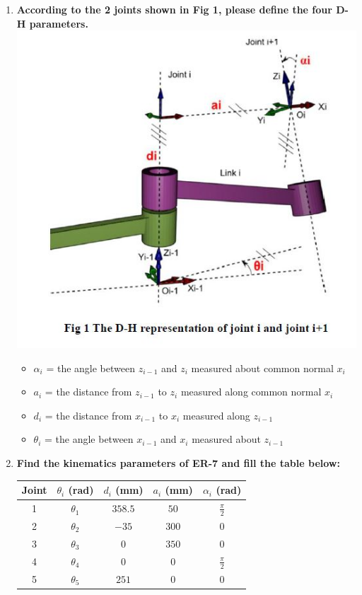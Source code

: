 \documentclass[12pt, a4paper]{article}
\begin{document}
\begin{enumerate}[(1)]
\newpage
\item
{\bf According to the 2 joints shown in Fig 1, please define the four D-H parameters.} \\
\includegraphics{fig1.JPG}
\begin{itemize}
\item 
$\alpha_i$ = the angle between $z_{i-1}$ and $z_i$ measured about common normal $x_i$
\item
$a_i$ = the distance from $z_{i-1}$ to $z_i$ measured along common normal $x_i$
\item
$d_i$ = the distance from $x_{i-1}$ to $x_i$ measured along $z_{i - 1}$
\item
$\theta_i$ = the angle between $x_{i-1}$ and $x_i$ measured about $z_{i - 1}$
\end{itemize}

\item
{\bf Find the kinematics parameters of ER-7 and fill the table below: } \\
\begin{tabular}[t]{|ccccc|}
\hline 
Joint & $\theta_i$ (rad) & $d_i$ (mm) & $a_i$ (mm) & $\alpha_i$ (rad) \\
\hline
1 & $\theta_1$ & $358.5$ & $50$ & $\frac{\pi}{2}$ \\
\hline
2 & $\theta_2$ & $-35$ & $300$ & 0 \\
\hline
3 & $\theta_3$ & $0$ & $350$ & 0 \\
\hline
4 & $\theta_4$ & $0$ & $0$ & $\frac{\pi}{2}$ \\
\hline
5 & $\theta_5$ & $251$ & $0$ & $0$ \\
\hline
\end{tabular} 

\end{enumerate}
\end{document}
